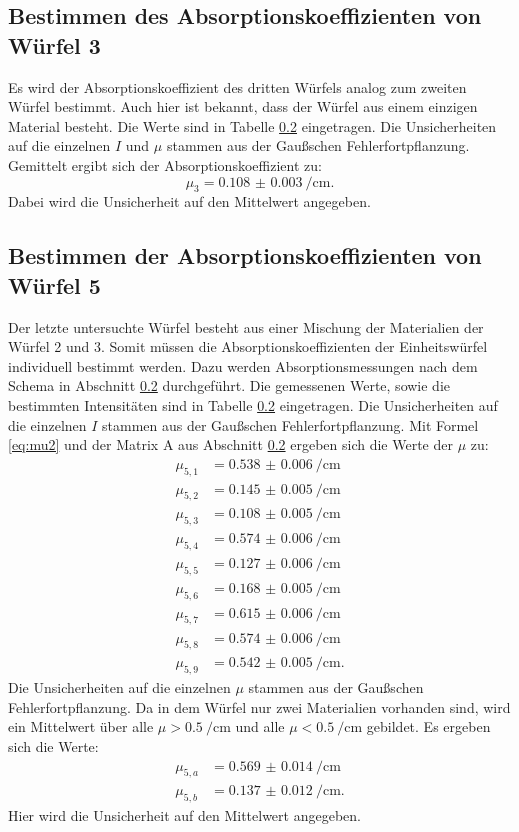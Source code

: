 \subsection{Bestimmen des Absorptionskoeffizienten von Würfel 3}

Es wird der Absorptionskoeffizient des dritten Würfels analog zum zweiten Würfel bestimmt. Auch hier ist bekannt, dass der Würfel aus einem einzigen Material besteht. Die Werte sind in Tabelle \ref{} eingetragen. Die Unsicherheiten auf die einzelnen $I$ und $\mu$ stammen aus der Gaußschen Fehlerfortpflanzung.
Gemittelt ergibt sich der Absorptionskoeffizient zu:
\[
\mu_3 = \SI{0.108(3)}{\per\centi\metre}\text{.}
\]
Dabei wird die Unsicherheit auf den Mittelwert angegeben.

\subsection{Bestimmen der Absorptionskoeffizienten von Würfel 5}

Der letzte untersuchte Würfel besteht aus einer Mischung der Materialien der Würfel 2 und 3. Somit müssen die Absorptionskoeffizienten der Einheitswürfel individuell bestimmt werden. Dazu werden Absorptionsmessungen nach dem Schema in Abschnitt \ref{} durchgeführt. Die gemessenen Werte, sowie die bestimmten Intensitäten sind in Tabelle \ref{} eingetragen. Die Unsicherheiten auf die einzelnen $I$ stammen aus der Gaußschen Fehlerfortpflanzung.
Mit Formel \eqref{eq:mu2} und der Matrix A aus Abschnitt \ref{} ergeben sich die Werte der $\mu$ zu:
\begin{align*}
\mu_{5,1} &= \SI{0.538(6)}{\per\centi\metre}\\
\mu_{5,2} &= \SI{0.145(5)}{\per\centi\metre}\\
\mu_{5,3} &= \SI{0.108(5)}{\per\centi\metre}\\
\mu_{5,4} &= \SI{0.574(6)}{\per\centi\metre}\\
\mu_{5,5} &= \SI{0.127(6)}{\per\centi\metre}\\
\mu_{5,6} &= \SI{0.168(5)}{\per\centi\metre}\\
\mu_{5,7} &= \SI{0.615(6)}{\per\centi\metre}\\
\mu_{5,8} &= \SI{0.574(6)}{\per\centi\metre}\\
\mu_{5,9} &= \SI{0.542(5)}{\per\centi\metre}\text{.}
\end{align*}
Die Unsicherheiten auf die einzelnen $\mu$ stammen aus der Gaußschen Fehlerfortpflanzung.
Da in dem Würfel nur zwei Materialien vorhanden sind, wird ein Mittelwert über alle $\mu >\SI{0.5}{\per\centi\metre}$ und alle $\mu <\SI{0.5}{\per\centi\metre}$ gebildet. Es ergeben sich die Werte:
\begin{align*}
\mu_{5,a} &= \SI{0.569(14)}{\per\centi\metre}\\
\mu_{5,b} &= \SI{0.137(12)}{\per\centi\metre}\text{.}
\end{align*}
Hier wird die Unsicherheit auf den Mittelwert angegeben.

